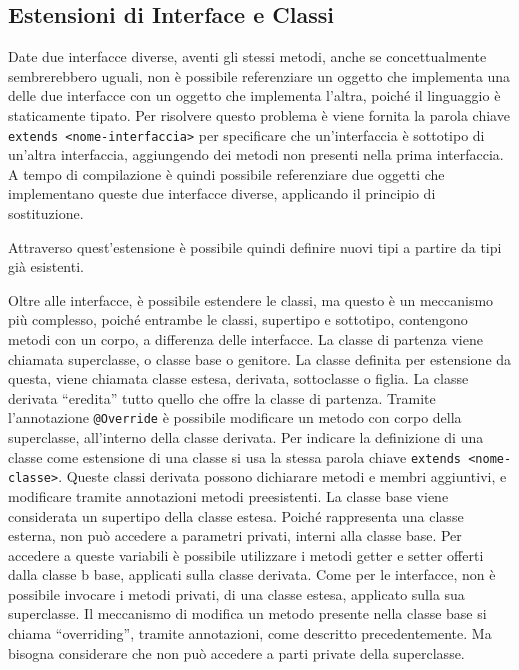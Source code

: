 \documentclass{article}
\numberwithin{equation}{subsection}
\begin{document}
\subsection{Estensioni di Interface e Classi}

Date due interfacce diverse, aventi gli stessi metodi, anche se concettualmente sembrerebbero uguali, non è possibile referenziare un oggetto che implementa una delle due interfacce 
con un oggetto che implementa l'altra, poiché il linguaggio è staticamente tipato. Per risolvere questo problema è viene fornita la parola chiave \verb|extends <nome-interfaccia>| per 
specificare che un'interfaccia è sottotipo di un'altra interfaccia, aggiungendo dei metodi non presenti nella prima interfaccia. A tempo di compilazione è quindi possibile 
referenziare due oggetti che implementano queste due interfacce diverse, applicando il principio di sostituzione. 

Attraverso quest'estensione è possibile quindi definire nuovi tipi a partire da tipi già esistenti. 


Oltre alle interfacce, è possibile estendere le classi, ma questo è un meccanismo più complesso, poiché entrambe le classi, supertipo e sottotipo, contengono metodi con un corpo, 
a differenza delle interfacce. La classe di partenza viene chiamata superclasse, o classe base o genitore. La classe definita per estensione da questa, viene chiamata classe estesa, 
derivata, sottoclasse o figlia. 
La classe derivata ``eredita'' tutto quello che offre la classe di partenza. Tramite l'annotazione \verb|@Override| è possibile modificare un metodo con corpo della superclasse, 
all'interno della classe derivata. 
Per indicare la definizione di una classe come estensione di una classe si usa la stessa parola chiave \verb|extends <nome-classe>|. Queste classi derivata possono dichiarare 
metodi e membri aggiuntivi, e modificare tramite annotazioni metodi preesistenti. La classe base viene considerata un supertipo della classe estesa. Poiché rappresenta una classe 
esterna, non può accedere a parametri privati, interni alla classe base. Per accedere a queste variabili è possibile utilizzare i metodi getter e setter offerti dalla classe b
base, applicati sulla classe derivata. 
Come per le interfacce, non è possibile invocare i metodi privati, di una classe estesa, applicato sulla sua superclasse. 
Il meccanismo di modifica un metodo presente nella classe base si chiama ``overriding'', tramite annotazioni, come descritto precedentemente. Ma bisogna considerare che non 
può accedere a parti private della superclasse. 
\end{document}
